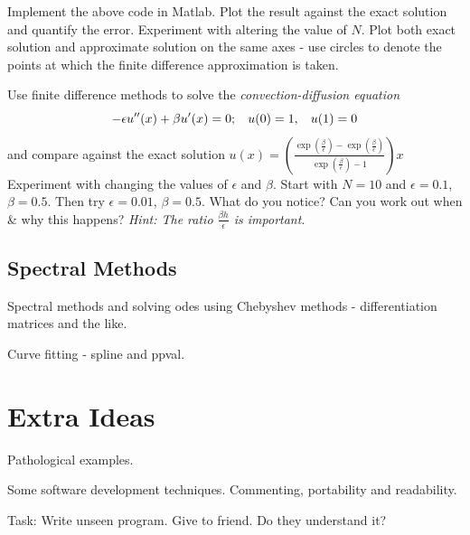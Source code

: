 \documentclass[12pt]{report}
\begin{document}
\begin{itemize}
\begin{tcolorbox}[title=Task]
Implement the above code in Matlab. Plot the result against the exact solution and quantify the error. Experiment with altering the value of $N$. Plot both exact solution and approximate solution on the same axes - use circles to denote the points at which the finite difference approximation is taken.
\end{tcolorbox}

\begin{tcolorbox}[title=Task]
Use finite difference methods to solve the \textit{convection-diffusion equation}
\begin{displaymath}
-\epsilon u''(x) + \beta u'(x) = 0; \hspace{3mm} u(0) = 1, \hspace{3mm} u(1) = 0
\end{displaymath}
and compare against the exact solution $u(x) = \left(\frac{\exp\left(\frac{\beta}{\epsilon}\right)-\exp\left(\frac{\beta}{\epsilon}\right)}{\exp\left(\frac{\beta}{\epsilon}\right)-1}\right)x$
\tcblower
Experiment with changing the values of $\epsilon$ and $\beta$. Start with $N=10$ and $\epsilon = 0.1$, $\beta = 0.5$. Then try $\epsilon = 0.01$, $\beta = 0.5$. What do you notice? Can you work out when \& why this happens? \textit{Hint: The ratio $\frac{\beta h}{\epsilon}$ is important}.
\end{tcolorbox}

\end{itemize}

\subsection*{Spectral Methods}

Spectral methods and solving odes using Chebyshev  methods - differentiation matrices and the like. 

Curve fitting - spline and ppval.

\section*{Extra Ideas}

Pathological examples. 

Some software development techniques. Commenting, portability and readability.

Task: Write unseen program. Give to friend. Do they understand it?
\end{document}
